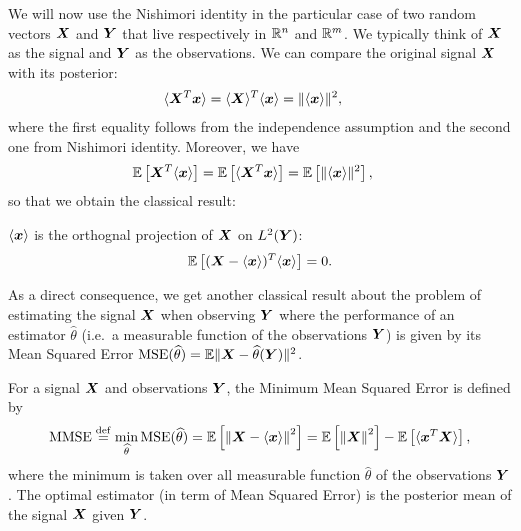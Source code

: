\documentclass[12pt,nocut]{article}
\begin{document}
We will now use the Nishimori identity in the particular case of two random vectors ${\boldsymbol X}$ and ${\boldsymbol Y}$ that live respectively in $\mathbb{R}^n$ and $\mathbb{R}^m$.
We typically think of ${\boldsymbol X}$ as the signal and ${\boldsymbol Y}$ as the observations. We can compare the original signal ${\boldsymbol X}$ with its posterior:
\begin{align*}
\langle {\boldsymbol X}^T {\boldsymbol x} \rangle &=  \langle {\boldsymbol X} \rangle^T \langle {\boldsymbol x} \rangle =\| \langle {\boldsymbol x} \rangle\|^2,
\end{align*}
where the first equality follows from the independence assumption and the second one from Nishimori identity. Moreover, we have
\begin{align*}
\mathbb{E} \left[ {\boldsymbol X}^T \langle {\boldsymbol x} \rangle \right] &=  \mathbb{E} \left[\langle {\boldsymbol X}^T {\boldsymbol x} \rangle\right] = \mathbb{E} \left[\| \langle {\boldsymbol x} \rangle\|^2 \right],
\end{align*}
so that we obtain the classical result:
\begin{proposition}\label{prop:proj}
$\langle {\boldsymbol x} \rangle$ is the orthognal projection of ${\boldsymbol X}$ on $L^2({\boldsymbol Y})$:
\begin{align*}
\mathbb{E} \left[ ({\boldsymbol X}- \langle {\boldsymbol x} \rangle)^T \langle {\boldsymbol x} \rangle \right] = 0.
\end{align*}
\end{proposition}
As a direct consequence, we get another classical result about the problem of estimating the signal ${\boldsymbol X}$ when observing ${\boldsymbol Y}$ where
the performance of an estimator $\widehat{\theta}$ (i.e.\ a measurable function of the observations ${\boldsymbol Y}$) is given by its Mean Squared Error ${{\rm MSE}}(\widehat{\theta}) = \mathbb{E} \| {\boldsymbol X} - \widehat{\theta}({\boldsymbol Y}) \|^2$.
\begin{definition}\label{def:MMSE}
For a signal ${\boldsymbol X}$ and observations ${\boldsymbol Y}$, the Minimum Mean Squared Error is defined by
$$
{{\rm MMSE}} \overset{{\rm def}}{=} \min_{\widehat{\theta}} {{\rm MSE}}(\widehat{\theta})= \mathbb{E} \left[ \left\| {\boldsymbol X} - \langle {\boldsymbol x} \rangle \right\|^2 \right] = \mathbb{E} \left[\left\| {\boldsymbol X} \right\|^2 \right]- \mathbb{E}\left[\langle {\boldsymbol x}^T{\boldsymbol X}\rangle \right],
$$
where the minimum is taken over all measurable function $\widehat{\theta}$ of the observations ${\boldsymbol Y}$. 
The optimal estimator (in term of Mean Squared Error) is the posterior mean of the signal ${\boldsymbol X}$ given ${\boldsymbol Y}$.
\end{definition}
\end{document}
